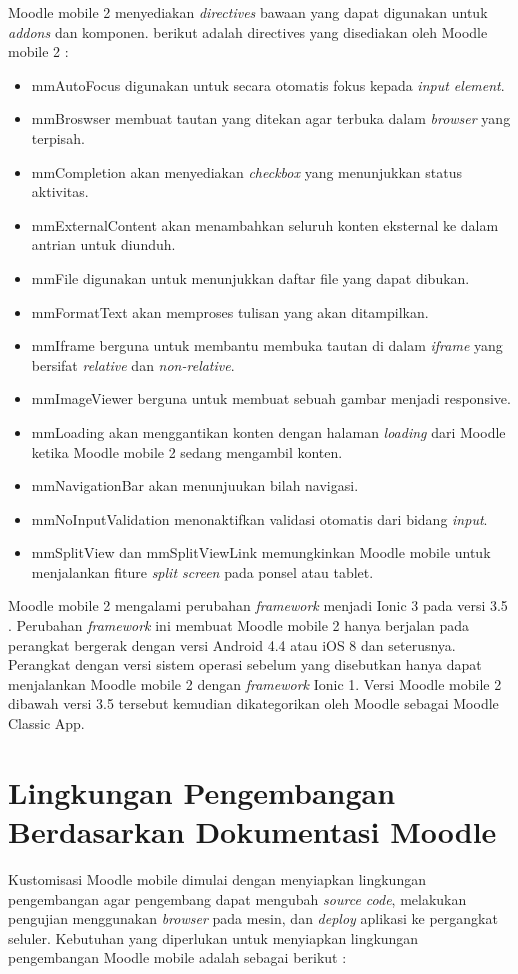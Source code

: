 Moodle mobile 2 menyediakan \textit{directives} bawaan yang dapat digunakan untuk \textit{addons} dan komponen. berikut adalah directives yang disediakan oleh Moodle mobile 2 : \cite{moodle:dev}
\begin{itemize}
\item mmAutoFocus digunakan untuk secara otomatis fokus kepada \textit{input element}.
\item mmBroswser membuat tautan yang ditekan agar terbuka dalam \textit{browser} yang terpisah.
\item mmCompletion akan menyediakan \textit{checkbox} yang menunjukkan status aktivitas.
\item mmExternalContent akan menambahkan seluruh konten eksternal ke dalam antrian untuk diunduh.
\item mmFile digunakan untuk menunjukkan daftar file yang dapat dibukan.
\item mmFormatText akan memproses tulisan yang akan ditampilkan.
\item mmIframe berguna untuk membantu membuka tautan di dalam \textit{iframe} yang bersifat \textit{relative} dan \textit{non-relative}.
\item mmImageViewer berguna untuk membuat sebuah gambar menjadi responsive.
\item mmLoading akan menggantikan konten dengan halaman \textit{loading} dari Moodle ketika Moodle mobile 2 sedang mengambil konten.
\item mmNavigationBar akan menunjuukan bilah navigasi.
\item mmNoInputValidation menonaktifkan validasi otomatis dari bidang \textit{input}.
\item mmSplitView dan mmSplitViewLink memungkinkan Moodle mobile untuk menjalankan fiture \textit{split screen} pada ponsel atau tablet.
\end{itemize}

Moodle mobile 2 mengalami perubahan \textit{framework} menjadi Ionic 3 pada versi 3.5 \cite{moodle:dev}. Perubahan \textit{framework} ini membuat Moodle mobile 2 hanya berjalan pada perangkat bergerak dengan versi Android 4.4 atau iOS 8 dan seterusnya. Perangkat dengan versi sistem operasi sebelum yang disebutkan hanya dapat menjalankan Moodle mobile 2 dengan \textit{framework} Ionic 1. Versi Moodle mobile 2 dibawah versi 3.5 tersebut kemudian dikategorikan oleh Moodle sebagai Moodle Classic App.



\section{Lingkungan Pengembangan Berdasarkan Dokumentasi Moodle}
\label{moodle docs:env}
Kustomisasi Moodle mobile dimulai dengan menyiapkan lingkungan pengembangan agar pengembang dapat mengubah \textit{source code}, melakukan pengujian menggunakan \textit{browser} pada mesin, dan \textit{deploy} aplikasi ke pergangkat seluler. Kebutuhan yang diperlukan untuk menyiapkan lingkungan pengembangan Moodle mobile adalah sebagai berikut : \cite{moodle:dev}


